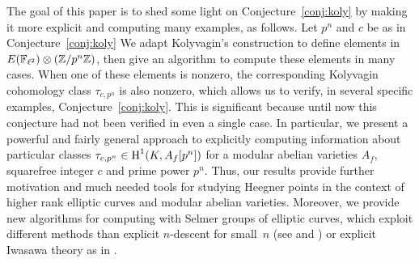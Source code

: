 \documentclass{article} \usepackage[active]{srcltx}
\begin{document}
The goal of this paper is to shed some light on
Conjecture~\ref{conj:koly} by making it more explicit and computing
many examples, as follows.  
Let $p^n$ and $c$ be as in Conjecture~\ref{conj:koly}
We adapt
Kolyvagin's construction to define elements in
$E(\mathbb{F}_{\ell^2})\otimes(\mathbb{Z}/p^n\mathbb{Z})$, then give an algorithm to compute
these elements in many cases.  When one of these elements is nonzero,
the corresponding Kolyvagin cohomology class $\tau_{c,p^n}$ is also nonzero,
which allows us to verify, in several specific examples,
Conjecture~\ref{conj:koly}.  This is significant because until now
this conjecture had not been verified in even a single case.  In
particular, we present a powerful and fairly general approach to
explicitly computing information about particular classes
$\tau_{c,p^n}\in \operatorname{H}^1(K,A_f[p^n])$ for a modular abelian varieties
$A_f$, squarefree integer $c$ and prime power $p^n$.  Thus, our
results provide further motivation and much needed tools for studying
Heegner points in the context of higher rank elliptic curves and
modular abelian varieties.  Moreover, we provide new algorithms for
computing with Selmer groups of elliptic curves, which exploit
different methods than explicit $n$-descent for small~$n$ (see
\cite[\S3.5]{cremona:algs} and
\cite{cremona-fisher-oneil-simon-stoll:n-descent}) or explicit Iwasawa
theory as in \cite{stein-wuthrich}.


\end{document}
